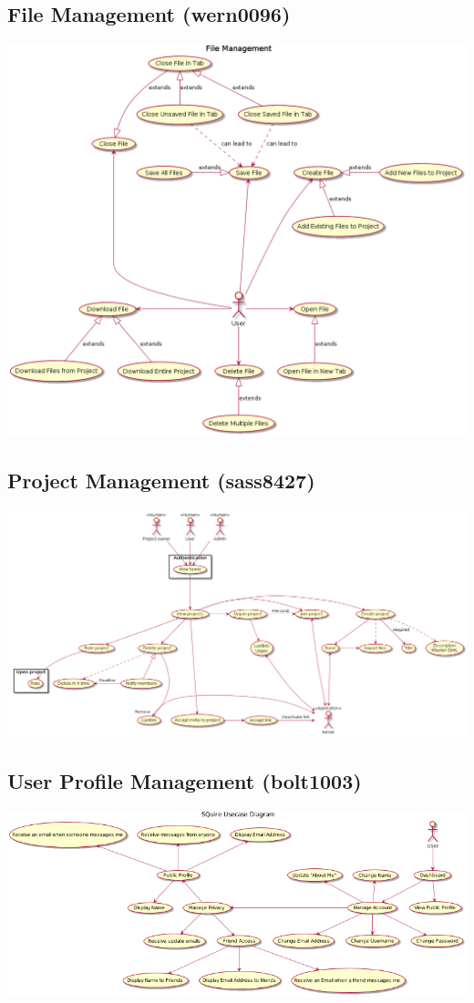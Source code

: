 \documentclass[11pt]{report}
\begin{document}
\subsection{File Management (wern0096)}
\includegraphics[width=\textwidth]{diagrams/wern0096-FileManagement}

\subsection{Project Management (sass8427)}
\includegraphics[width=\textwidth]{sass8427}

\subsection{User Profile Management (bolt1003)}
\includegraphics[width=\textwidth]{diagrams/bolt1003}
\end{document}
